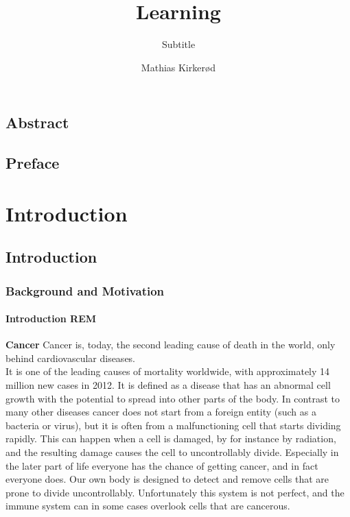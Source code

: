 \documentclass[a4paper,english]{ifimaster}
\title{Learning}
\subtitle{Subtitle}
\author{Mathias Kirkerød}
\begin{document}
\duoforside[dept={Department of Informatics},
program={Informatics: Language and Communication},
long]

\frontmatter{}
\chapter*{Abstract}

\tableofcontents{}
\listoffigures{}
\listoftables{}

\chapter*{Preface}

\mainmatter{}






















\part{Introduction}
\chapter{Introduction}
	\section{Background and Motivation}
	\subsection{Introduction REM}
	\textbf{Cancer}
	Cancer is, today, the second leading cause of death in the world, only behind cardiovascular diseases.\\  %
	It is one of the leading causes of mortality worldwide, with approximately 14 million new cases in 2012. %
	It is defined as a disease that has an abnormal cell growth with the potential to spread into other parts of the body.%
	In contrast to many other diseases cancer does not start from a foreign entity (such as a bacteria or virus), but it is often from a malfunctioning cell that starts dividing rapidly. 
	This can happen when a cell is damaged, by for instance by radiation, and the resulting damage causes the cell to uncontrollably divide. 
	Especially in the later part of life everyone has the chance of getting cancer, and in fact everyone does. Our own body is designed to detect and remove cells that are prone
	to divide uncontrollably. Unfortunately this system is not perfect, and the immune system can in some cases overlook cells that are cancerous.
	
\end{document}
